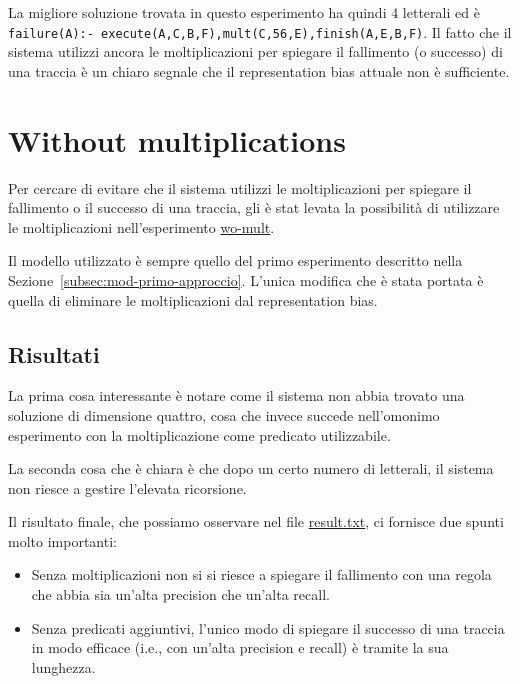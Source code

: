 \myskip

La migliore soluzione trovata in questo esperimento ha quindi 4 letterali ed è \\ \texttt{failure(A):- execute(A,C,B,F),mult(C,56,E),finish(A,E,B,F)}. Il fatto che il sistema utilizzi ancora le moltiplicazioni per spiegare il fallimento (o successo) di una traccia è un chiaro segnale che il representation bias attuale non è sufficiente.

\section{Without multiplications}
\label{sec:wo-mult}
Per cercare di evitare che il sistema utilizzi le moltiplicazioni per spiegare il fallimento o il successo di una traccia, gli è stat levata la possibilità di utilizzare le moltiplicazioni nell'esperimento \href{https://github.com/edoardosarri24/numsynth/tree/main/my-experiments/4-wo-mult/}{wo-mult}.

Il modello utilizzato è sempre quello del primo esperimento descritto nella Sezione~\ref{subsec:mod-primo-approccio}. L'unica modifica che è stata portata è quella di eliminare le moltiplicazioni dal representation bias.

\subsection{Risultati}
La prima cosa interessante è notare come il sistema non abbia trovato una soluzione di dimensione quattro, cosa che invece succede nell'omonimo esperimento con la moltiplicazione come predicato utilizzabile.

La seconda cosa che è chiara è che dopo un certo numero di letterali, il sistema non riesce a gestire l'elevata ricorsione.

\myskip

Il risultato finale, che possiamo osservare nel file \href{https://github.com/edoardosarri24/numsynth/tree/main/my-experiments/4-wo-mult/result.txt}{result.txt}, ci fornisce due spunti molto importanti:
\begin{itemize}
    \item Senza moltiplicazioni non si si riesce a spiegare il fallimento con una regola che abbia sia un'alta precision che un'alta recall.
    \item Senza predicati aggiuntivi, l'unico modo di spiegare il successo di una traccia in modo efficace (i.e., con un'alta precision e recall) è tramite la sua lunghezza.
\end{itemize}

